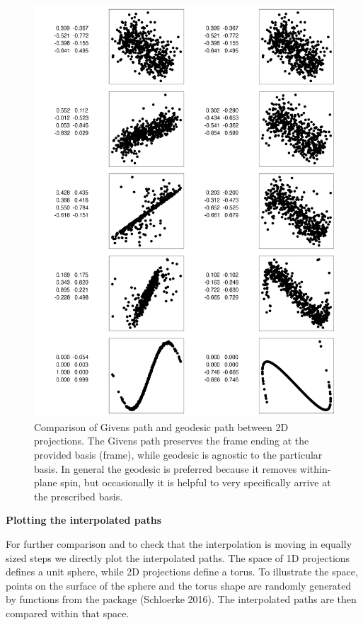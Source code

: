 \begin{figure}

{\centering \includegraphics[width=0.8\linewidth]{figures/compare-paths} 

}

\caption{Comparison of Givens path and geodesic path between 2D projections. The Givens path preserves the frame ending at the provided basis (frame), while geodesic is agnostic to the particular basis. In general the geodesic is preferred because it removes within-plane spin, but occasionally it is helpful to very specifically arrive at the prescribed basis.}\label{fig:compare-paths}
\end{figure}

\textbf{Plotting the interpolated paths}

For further comparison and to check that the interpolation is moving in equally sized steps we directly plot the interpolated paths. The space of 1D projections defines a unit sphere, while 2D projections define a torus. To illustrate the space, points on the surface of the sphere and the torus shape are randomly generated by functions from the  package (Schloerke 2016). The interpolated paths are then compared within that space.

